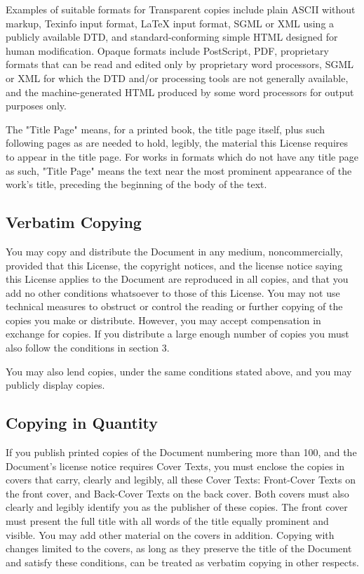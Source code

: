 	Examples of suitable formats for Transparent copies include plain ASCII without markup, Texinfo input format, LaTeX input format, SGML or XML using a publicly available DTD, and standard-conforming simple HTML designed for human modification. Opaque formats include PostScript, PDF, proprietary formats that can be read and edited only by proprietary word processors, SGML or XML for which the DTD and/or processing tools are not generally available, and the machine-generated HTML produced by some word processors for output purposes only. 

	The "Title Page" means, for a printed book, the title page itself, plus such following pages as are needed to hold, legibly, the material this License requires to appear in the title page. For works in formats which do not have any title page as such, "Title Page" means the text near the most prominent appearance of the work's title, preceding the beginning of the body of the text. 

	\subsection{Verbatim Copying} 
	You may copy and distribute the Document in any medium, noncommercially, provided that this License, the copyright notices, and the license notice saying this License applies to the Document are reproduced in all copies, and that you add no other conditions whatsoever to those of this License. You may not use technical measures to obstruct or control the reading or further copying of the copies you make or distribute. However, you may accept compensation in exchange for copies. If you distribute a large enough number of copies you must also follow the conditions in section 3. 

	You may also lend copies, under the same conditions stated above, and you may publicly display copies. 

	\subsection{Copying in Quantity}

	If you publish printed copies of the Document numbering more than 100, and the Document's license notice requires Cover Texts, you must enclose the copies in covers that carry, clearly and legibly, all these Cover Texts: Front-Cover Texts on the front cover, and Back-Cover Texts on the back cover. Both covers must also clearly and legibly identify you as the publisher of these copies. The front cover must present the full title with all words of the title equally prominent and visible. You may add other material on the covers in addition. Copying with changes limited to the covers, as long as they preserve the title of the Document and satisfy these conditions, can be treated as verbatim copying in other respects. 

